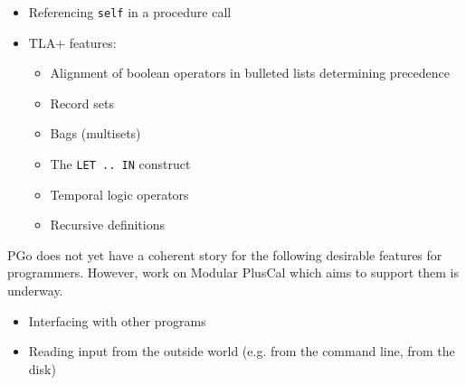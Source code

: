 \begin{itemize}
\item Referencing \lstinline[language=pcal]|self| in a procedure call

\item TLA+ features:

	\begin{itemize}
	\item Alignment of boolean operators in bulleted lists determining precedence
	
	\item Record sets
	
	\item Bags (multisets)
	
	\item The \lstinline[language=pcal]|LET .. IN| construct
	
	\item Temporal logic operators
	
	\item Recursive definitions
	\end{itemize}
\end{itemize}

PGo does not yet have a coherent story for the following desirable features for programmers. However, work on Modular PlusCal which aims to support them is underway.

\begin{itemize}
\item Interfacing with other programs

\item Reading input from the outside world (e.g. from the command line, from the disk)
\end{itemize}
